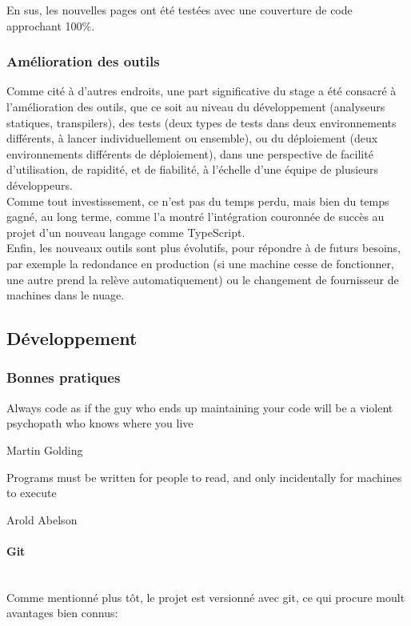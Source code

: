 \documentclass[a4paper,french,12pt]{article}
\begin{document}
		En sus, les nouvelles pages ont été testées avec une couverture de code approchant 100\%.
		
		\subsubsection{Amélioration des outils}

		Comme cité à d'autres endroits, une part significative du stage a été consacré à l'amélioration des outils, que ce soit au niveau du développement (analyseurs statiques, transpilers), des tests (deux types de tests dans deux environnements différents, à lancer individuellement ou ensemble), ou du déploiement (deux environnements différents de déploiement), dans une perspective de facilité d'utilisation, de rapidité, et de fiabilité, à l'échelle d'une équipe de plusieurs développeurs.~\\	
		
Comme tout investissement, ce n'est pas du temps perdu, mais bien du temps gagné, au long terme, comme l'a montré l'intégration couronnée de succès au projet d'un nouveau langage comme TypeScript.~\\

		Enfin, les nouveaux outils sont plus évolutifs, pour répondre à de futurs besoins, par exemple la redondance en production (si une machine cesse de fonctionner, une autre prend la relève automatiquement) ou le changement de fournisseur de machines dans le nuage.


	\subsection{Développement}

	  \subsubsection{Bonnes pratiques}
	    \epigraph{Always code as if the guy who ends up maintaining your code will be a violent psychopath who knows where you live}{Martin Golding}
	    \epigraph{Programs must be written for people to read, and only incidentally for machines to execute}{Arold Abelson}

	\paragraph{Git}~\\	
	    Comme mentionné plus tôt, le projet est versionné avec git, ce qui procure moult avantages bien connus:~\\
	    
\end{document}
